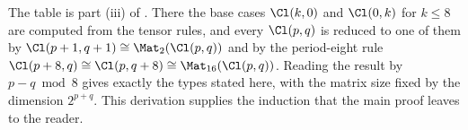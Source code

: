 The table is part (iii) of . There the base cases $\Cl(k,0)$ and $\Cl(0,k)$ for $k \le 8$ are computed from the tensor rules, and every $\Cl(p,q)$ is reduced to one of them by $\Cl(p+1,q+1) \cong \Mat_2(\Cl(p,q))$ and by the period-eight rule $\Cl(p+8,q) \cong \Cl(p,q+8) \cong \Mat_{16}(\Cl(p,q))$. Reading the result by $p - q \bmod 8$ gives exactly the types stated here, with the matrix size fixed by the dimension $2^{p+q}$. This derivation supplies the induction that the main proof leaves to the reader.
